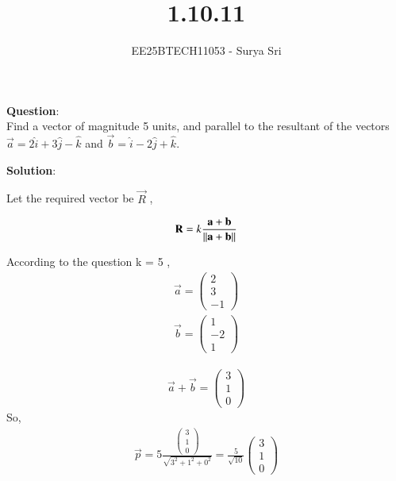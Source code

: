 \documentclass[journal]{IEEEtran}
\begin{document}

\vspace{3cm}

\title{1.10.11}
\author{EE25BTECH11053 - Surya Sri}
{\let\newpage\relax\maketitle}

\renewcommand{\thefigure}{\theenumi}
\renewcommand{\thetable}{\theenumi}
\setlength{\intextsep}{10pt} %

\textbf{Question}:\\
Find a vector of magnitude 5 units, and parallel to the resultant of the vectors $\vec{a} = 2\hat{i} + 3\hat{j} - \hat{k}$ and $\vec{b} = \hat{i} - 2\hat{j} + \hat{k}$.


\bigskip
\textbf{Solution}:



Let the required vector be $\vec{R}$ ,

\begin{align}
    \mathbf{R} = k \frac{\mathbf{a} + \mathbf{b}}{\left\lVert\mathbf{a} + \mathbf{b}\right\rVert}
\end{align}

  According to the question k = 5 ,
\begin{align}
     \vec{a} = \begin{pmatrix} 2 \\ 3 \\ -1 \end{pmatrix} 
 \end{align}
 \begin{align}
 \vec{b} = \begin{pmatrix} 1 \\ -2 \\ 1 \end{pmatrix} 
 \end{align}

\begin{align}
\vec{a} + \vec{b} = \begin{pmatrix} 3 \\ 1 \\ 0 \end{pmatrix}
\end{align}
So,
\begin{align}
\vec{p} = 5 \frac{\begin{pmatrix} 3 \\ 1 \\ 0 \end{pmatrix}}{\sqrt{3^2 + 1^2 + 0^2}} = \frac{5}{\sqrt{10}} \begin{pmatrix} 3 \\ 1 \\ 0 \end{pmatrix}
\end{align}
\end{document}
